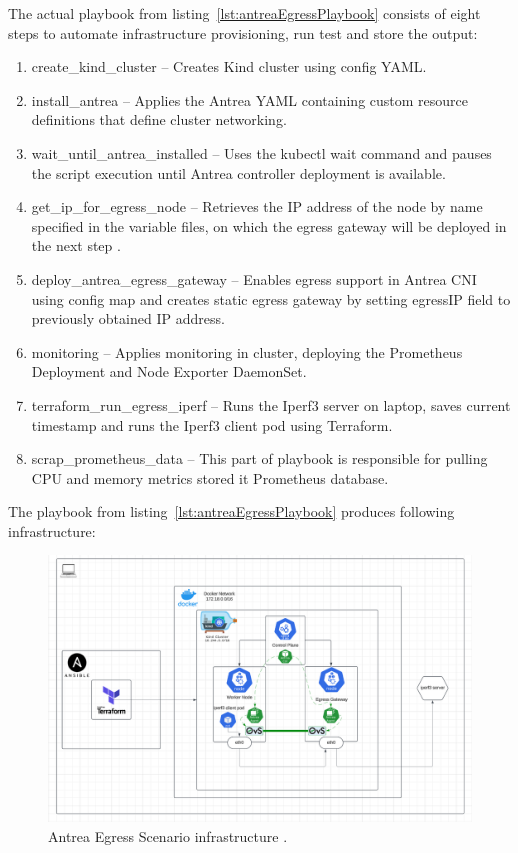 The actual playbook from listing~\ref{lst:antreaEgressPlaybook} consists of eight steps to automate infrastructure provisioning, run test and store the output:
\begin{enumerate}
  \item create\_kind\_cluster -- Creates Kind cluster using config YAML.
  \item install\_antrea -- Applies the Antrea YAML containing custom resource definitions that define cluster networking.
  \item wait\_until\_antrea\_installed -- Uses the kubectl wait command and pauses the script execution until Antrea controller deployment is available.
  \item get\_ip\_for\_egress\_node -- Retrieves the IP address of the node by name specified in the variable files, on which the egress gateway will be deployed in the next step .
  \item deploy\_antrea\_egress\_gateway -- Enables egress support in Antrea CNI using config map and creates static egress gateway by setting egressIP field to previously obtained IP address.
  \item monitoring -- Applies monitoring in cluster, deploying the Prometheus Deployment and Node Exporter DaemonSet.
  \item terraform\_run\_egress\_iperf -- Runs the Iperf3 server on laptop, saves current timestamp and runs the Iperf3 client pod using Terraform.
  \item scrap\_prometheus\_data -- This part of playbook is responsible for pulling CPU and memory metrics stored it Prometheus database.
\end{enumerate}

The playbook from listing~\ref{lst:antreaEgressPlaybook} produces following infrastructure:

\begin{figure}[tbh]
  \centering
  \includegraphics[width=1\columnwidth]{images/antrea_egress_gatateway_cluster.png}
  \caption{Antrea Egress Scenario infrastructure \cite{AntreaEgressArch}\cite{NGINX}\cite{K8sIcons}\cite{TerraformIcon}\cite{AnsibleIcon}\cite{KindIcon}\cite{DockerIcon}\cite{LucidApp}.}
  \label{fig:antreaEgressScenarioArch}
\end{figure}

